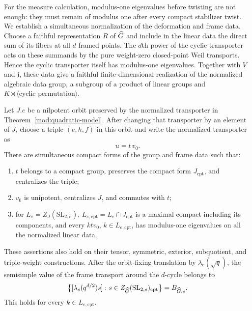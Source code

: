 For the measure calculation, modulus-one eigenvalues before twisting
are not enough: they must remain of modulus one after every compact
stabilizer twist. We establish a simultaneous normalization of the
deformation and frame data. Choose a faithful representation $R$ of
$\widehat G$ and include in the linear data the direct sum of its fibers at
all $d$ framed points. The $d$th power of the cyclic transporter acts
on these summands by the pure weight-zero closed-point Weil
transports. Hence the cyclic transporter itself has modulus-one
eigenvalues. Together with $V$ and $\mathfrak j$, these data give a
faithful finite-dimensional realization of the normalized algebraic
data group, a subgroup of a product of linear groups and
$K\rtimes\langle\text{cyclic permutation}\rangle$.

\begin{lemma}
\label{mod:compact-normalization}
Let $J.e$ be a nilpotent orbit preserved by the normalized transporter
in Theorem~\ref{mod:quadratic-model}. After changing that transporter
by an element of $J$, choose a triple $(e,h,f)$ in this orbit and
write the normalized transporter as
\[
 u=t\,v_0.
\]
There are simultaneous compact forms of the group and frame data
such that:
\begin{enumerate}[label=\textup{(\roman*)}]
\item $t$ belongs to a compact group, preserves the compact form
      $J_{\mathrm{cpt}}$, and centralizes the triple;
\item $v_0$ is unipotent, centralizes $J$, and commutes with $t$;
\item for $L_e=Z_J(\mathrm{SL}_{2,e})$,
      $L_{e,\mathrm{cpt}}=L_e\cap J_{\mathrm{cpt}}$ is a maximal
      compact including its components, and every
      $k t v_0$, $k\in L_{e,\mathrm{cpt}}$, has modulus-one
      eigenvalues on all the normalized linear data.
\end{enumerate}
These assertions also hold on their tensor, symmetric, exterior,
subquotient, and triple-weight constructions. After the
orbit-fixing translation by $\lambda_e(\sqrt q)$, the semisimple
value of the frame transport around the $d$-cycle belongs to
\begin{equation}
\label{mod:cyclic-compact-value}
 \bigl\{[\lambda_e(q^{d/2})s]:
         s\in Z_{\widehat G}(\mathrm{SL}_{2,e})_{\mathrm{cpt}}\bigr\}
 =B_{\widehat G.e}.
\end{equation}
This holds for every $k\in L_{e,\mathrm{cpt}}$.
\end{lemma}

